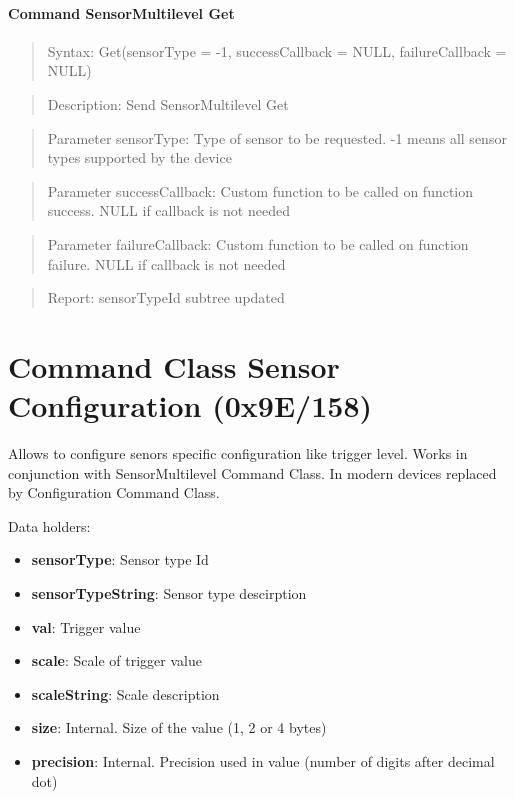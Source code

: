 \paragraph{Command SensorMultilevel Get}
\begin{quote}Syntax: Get(sensorType = -1, successCallback = NULL, failureCallback = NULL)\end{quote}
\begin{quote}Description: Send SensorMultilevel Get\end{quote}
\begin{quote}Parameter sensorType: Type of sensor to be requested. -1 means all sensor types supported by the device\end{quote}
\begin{quote}Parameter successCallback: Custom function to be called on function success. NULL if callback is not needed\end{quote}
\begin{quote}Parameter failureCallback: Custom function to be called on function failure. NULL if callback is not needed\end{quote}
\begin{quote}Report: sensorTypeId subtree updated\end{quote}


\section{Command Class Sensor Configuration (0x9E/158)}

Allows to configure senors specific configuration like trigger level. Works in conjunction with SensorMultilevel Command Class. In modern devices replaced by Configuration Command Class.
\newline

\noindent
Data holders:

\begin{itemize}
\item \textbf{sensorType}: Sensor type Id
\item \textbf{sensorTypeString}: Sensor type descirption
\item \textbf{val}: Trigger value
\item \textbf{scale}: Scale of trigger value
\item \textbf{scaleString}: Scale description
\item \textbf{size}: Internal. Size of the value (1, 2 or 4 bytes)
\item \textbf{precision}: Internal. Precision used in value (number of digits after decimal dot)
\end{itemize}

